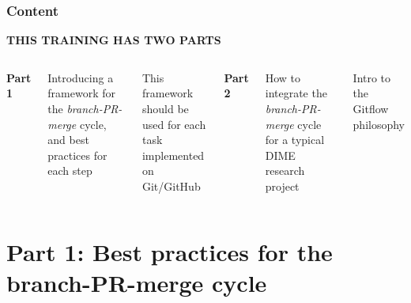 \documentclass[aspectratio=169]{beamer} %
\begin{document}
\begin{frame}
	\frametitle{Content}

	\Large\centering \textbf{THIS TRAINING HAS TWO PARTS}

	\vspace{.8em}

	\begin{columns}[T]



		\centering
		\large \textbf{Part 1}

		\vspace{1em}

		\raggedright
		\normalfont Introducing a framework for the
		\textit{branch-PR-merge} cycle,
		and best practices for each step

		\vspace{.5em}

		\normalfont This framework should be used for
		each task implemented on Git/GitHub



		\centering
		\large \textbf{Part 2}

		\vspace{1em}

		\raggedright
		\normalfont How to integrate the \textit{branch-PR-merge} cycle
		for a typical DIME research project

		\vspace{.5em}

		\normalfont Intro to the Gitflow philosophy


	\end{columns}

	\end{frame}



\section{Part 1: \newline Best practices for the branch-PR-merge cycle}
\end{document}

